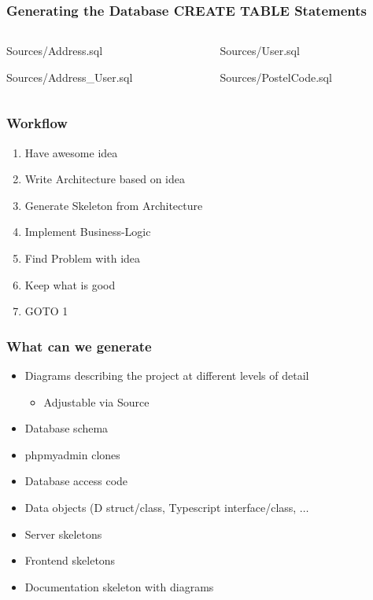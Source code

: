 \documentclass[xelatex,10pt]{beamer}
\begin{document}
\begin{frame}
	\frametitle{Generating the Database CREATE TABLE Statements}
\begin{columns}[T]
\begin{column}{0.49\linewidth}
	
	{Sources/Address.sql}
	
	{Sources/Address_User.sql}
\end{column}
\begin{column}{0.49\linewidth}
	
	{Sources/User.sql}
	
	{Sources/PostelCode.sql}
\end{column}
		
\end{columns}
\end{frame}

\begin{frame}
	\frametitle{Workflow}
	\begin{enumerate}
		\item Have awesome idea
		\item Write Architecture based on idea
		\item Generate Skeleton from Architecture
		\item Implement Business-Logic
		\item Find Problem with idea
		\item Keep what is good
		\item GOTO 1
		
	\end{enumerate}
	
\end{frame}

\begin{frame}
	\frametitle{What can we generate}
	\begin{itemize}
		\item Diagrams describing the project at different levels of detail
		\begin{itemize}
			\item Adjustable via Source
		\end{itemize}
		\item Database schema
		\item phpmyadmin clones
		\item Database access code
		\item Data objects (D struct/class, Typescript interface/class, \(\dots\)
		\item Server skeletons
		\item Frontend skeletons
		\item Documentation skeleton with diagrams
	\end{itemize}
\end{frame}
\end{document}
